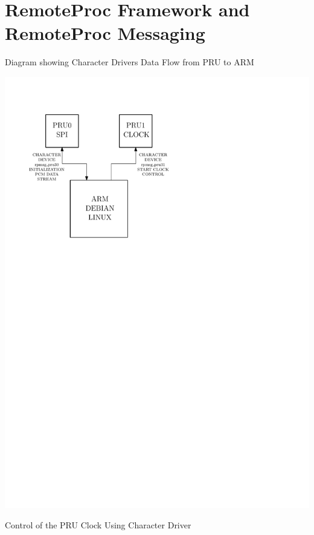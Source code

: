 \chapter{RemoteProc Framework and RemoteProc Messaging}


Diagram showing Character Drivers
Data Flow from PRU to ARM

\includegraphics{diagrams/char_devices_2}

Control of the PRU Clock Using Character Driver

